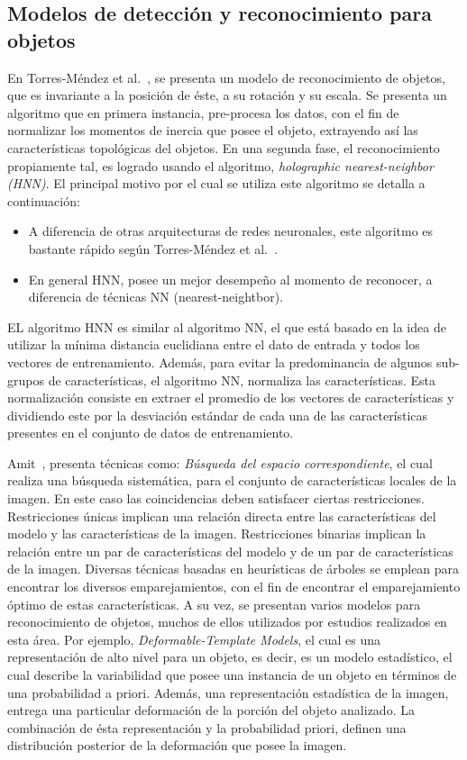 \subsection{Modelos de detección y reconocimiento para objetos}
En Torres-Méndez et al.~\cite{trsi2000}, se presenta un modelo de reconocimiento de objetos, que es invariante a la posición de éste, a su rotación y su escala. Se presenta un algoritmo que en primera instancia, pre-procesa los datos, con el fin de normalizar los momentos de inercia que posee el objeto, extrayendo así las características topológicas del objetos. En una segunda fase, el reconocimiento propiamente tal, es logrado usando el algoritmo, \textit{holographic nearest-neighbor (HNN)}. El principal motivo por el cual se utiliza este algoritmo se detalla a continuación:
\begin{itemize}
\item A diferencia de otras arquitecturas de redes neuronales, este algoritmo es bastante rápido según Torres-Méndez et al.~\cite{trsi2000}.
\item En general HNN, posee un mejor desempeño al momento de reconocer, a diferencia de técnicas NN (nearest-neightbor).
\end{itemize}
EL algoritmo HNN es similar al algoritmo NN, el que está basado en la idea de utilizar la mínima distancia euclidiana entre el dato de entrada y todos los vectores de entrenamiento. Además, para evitar la predominancia de algunos sub-grupos de características, el algoritmo NN, normaliza las características. Esta normalización consiste en extraer el promedio de los vectores de características y dividiendo este por la desviación estándar de cada una de las características presentes en el conjunto de datos de entrenamiento.

Amit~\cite{2dobject2002}, presenta técnicas como: \textit{Búsqueda del espacio correspondiente}, el cual realiza una búsqueda sistemática, para el conjunto de características locales de la imagen. En este caso las coincidencias deben satisfacer ciertas restricciones. Restricciones únicas implican una relación directa entre las características del modelo y las características de la imagen. Restricciones binarias implican la relación entre un par de características del modelo y de un par de características de la imagen. Diversas técnicas basadas en heurísticas de árboles se emplean para encontrar los diversos emparejamientos, con el fin de encontrar el emparejamiento óptimo de estas características. A su vez, se presentan varios modelos para reconocimiento de objetos, muchos de ellos utilizados por estudios realizados en esta área. Por ejemplo, \textit{Deformable-Template Models}, el cual es una representación de alto nivel para un objeto, es decir, es un modelo estadístico, el cual describe la variabilidad que posee una instancia de un objeto en términos de una probabilidad a priori. Además, una representación  estadística de la imagen, entrega una particular deformación de la porción del objeto analizado. La combinación de ésta representación y la probabilidad priori, definen una distribución posterior de la deformación que posee la imagen.

